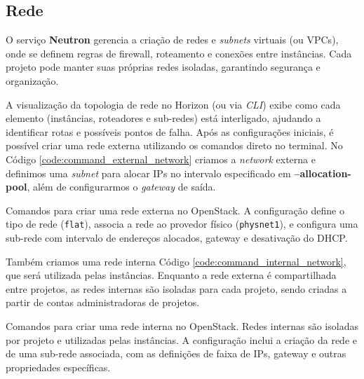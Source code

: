 \subsection{Rede}
O serviço \textbf{Neutron} gerencia a criação de redes e \textit{subnets} virtuais (ou VPCs), onde se definem regras de firewall, roteamento e conexões entre instâncias. Cada projeto pode manter suas próprias redes isoladas, garantindo segurança e organização.

A visualização da topologia de rede no Horizon (ou via \textit{CLI}) exibe como cada elemento (instâncias, roteadores e sub-redes) está interligado, ajudando a identificar rotas e possíveis pontos de falha. Após as configurações iniciais, é possível criar uma rede externa utilizando os comandos direto no terminal. No Código \ref{code:command_external_network} criamos a \textit{network} externa e definimos uma \textit{subnet} para alocar IPs no intervalo especificado em \textbf{--allocation-pool}, além de configurarmos o \textit{gateway} de saída.

\begin{listing}[h!]
    \noindent{}  
  \caption{Comandos para criar uma rede externa no OpenStack. A configuração define o tipo de rede (\texttt{flat}), associa a rede ao provedor físico (\texttt{physnet1}), e configura uma sub-rede com intervalo de endereços alocados, gateway e desativação do DHCP.}
  \label{code:command_external_network}
\end{listing}


Também criamos uma rede interna Código \ref{code:command_internal_network}, que será utilizada pelas instâncias. Enquanto a rede externa é compartilhada entre projetos, as redes internas são isoladas para cada projeto, sendo criadas a partir de contas administradoras de projetos.

\begin{listing}[h!]
    \noindent{}  
  \caption{Comandos para criar uma rede interna no OpenStack. Redes internas são isoladas por projeto e utilizadas pelas instâncias. A configuração inclui a criação da rede e de uma sub-rede associada, com as definições de faixa de IPs, gateway e outras propriedades específicas.}
  \label{code:command_internal_network}
\end{listing}

